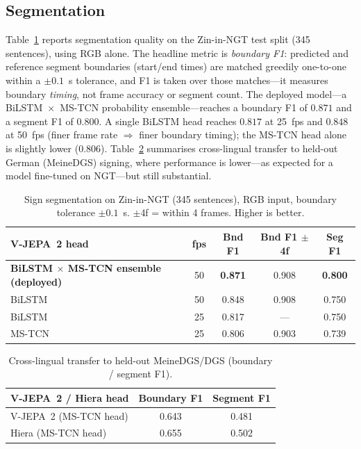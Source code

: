 \documentclass[11pt]{article}
\begin{document}
\subsection{Segmentation}
Table~\ref{tab:seg} reports segmentation quality on the Zin-in-NGT test split (345 sentences),
using RGB alone. The headline metric is \emph{boundary F1}: predicted and reference segment
boundaries (start/end times) are matched greedily one-to-one within a $\pm0.1$~s tolerance, and
F1 is taken over those matches---it measures boundary \emph{timing}, not frame accuracy or
segment count. The deployed model---a BiLSTM~$\times$~MS-TCN probability ensemble---reaches a
boundary F1 of $\mathbf{0.871}$ and a segment F1 of $0.800$. A single BiLSTM head reaches
$0.817$ at 25~fps and $0.848$ at 50~fps (finer frame rate $\Rightarrow$ finer boundary timing);
the MS-TCN head alone is slightly lower ($0.806$). Table~\ref{tab:dgs} summarises cross-lingual
transfer to held-out German (MeineDGS) signing, where performance is lower---as expected for a
model fine-tuned on NGT---but still substantial.

\begin{table}[t]
\centering
\caption{Sign segmentation on Zin-in-NGT (345 sentences), RGB input, boundary tolerance
$\pm0.1$~s. $\pm$4f = within 4 frames. Higher is better.}
\label{tab:seg}
\begin{tabular}{lcccc}
\toprule
V-JEPA~2 head & fps & Bnd F1 & Bnd F1 $\pm$4f & Seg F1 \\
\midrule
\textbf{BiLSTM $\times$ MS-TCN ensemble (deployed)} & 50 & \textbf{0.871} & 0.908 & \textbf{0.800} \\
BiLSTM & 50 & 0.848 & 0.908 & 0.750 \\
BiLSTM & 25 & 0.817 & --- & 0.750 \\
MS-TCN & 25 & 0.806 & 0.903 & 0.739 \\
\bottomrule
\end{tabular}
\end{table}

\begin{table}[t]
\centering
\caption{Cross-lingual transfer to held-out MeineDGS/DGS (boundary / segment F1).}
\label{tab:dgs}
\begin{tabular}{lcc}
\toprule
V-JEPA~2 / Hiera head & Boundary F1 & Segment F1 \\
\midrule
V-JEPA~2 (MS-TCN head) & 0.643 & 0.481 \\
Hiera (MS-TCN head)    & 0.655 & 0.502 \\
\bottomrule
\end{tabular}
\end{table}
\end{document}
